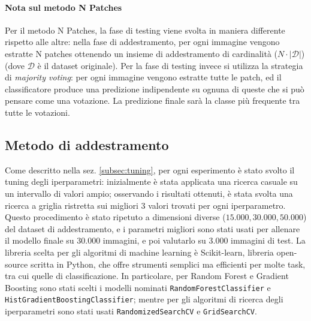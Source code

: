 \paragraph{Nota sul metodo N Patches}
Per il metodo N Patches, la fase di testing viene svolta in maniera differente rispetto alle altre: nella fase di addestramento, per ogni immagine vengono estratte N patches ottenendo un insieme di addestramento di cardinalità ($N\cdot |\mathcal{D}|$) (dove $\mathcal{D}$ è il dataset originale). Per la fase di testing invece si utilizza la strategia di \textit{majority voting}: per ogni immagine vengono estratte tutte le patch, ed il classificatore produce una predizione indipendente su ognuna di queste che si può pensare come una votazione. La predizione finale sarà la classe più frequente tra tutte le votazioni.\\
\subsection{Metodo di addestramento}
Come descritto nella sez. \ref{subsec:tuning}, per ogni esperimento è stato svolto il tuning degli iperparametri: inizialmente è stata applicata una ricerca casuale su un intervallo di valori ampio; osservando i risultati ottenuti, è stata svolta una ricerca a griglia ristretta sui migliori 3 valori trovati per ogni iperparametro. Questo procedimento è stato ripetuto a dimensioni diverse ($15.000, 30.000, 50.000$) del dataset di addestramento, e i parametri migliori sono stati usati per allenare il modello finale su $30.000$ immagini, e poi valutarlo su $3.000$ immagini di test.
La libreria scelta per gli algoritmi di machine learning è Scikit-learn, libreria open-source scritta in Python, che offre strumenti semplici ma efficienti per molte task, tra cui quelle di classificazione.
In particolare, per Random Forest e Gradient Boosting sono stati scelti i modelli nominati \texttt{RandomForestClassifier} e \texttt{HistGradientBoostingClassifier}; mentre per gli algoritmi di ricerca degli iperparametri sono stati usati \texttt{RandomizedSearchCV} e \texttt{GridSearchCV}.
